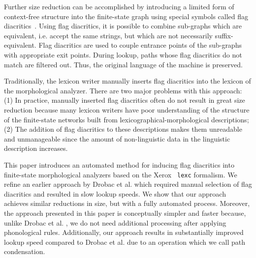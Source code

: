 \documentclass[11pt]{article}
\begin{document}

Further size reduction can be accomplished by introducing a limited
form of context-free structure into the finite-state graph using
special symbols called flag
diacritics~\cite{beesley1998constraining}. Using flag diacritics, it
is possible to combine sub-graphs which are equivalent, i.e. accept
the same strings, but which are not necessarily
suffix-equivalent. Flag diacritics are used to couple entrance points
of the sub-graphs with appropriate exit points. During lookup, paths
whose flag diacritics do not match are filtered out. Thus, the
original language of the machine is preserved.

Traditionally, the lexicon writer manually inserts flag diacritics
into the lexicon of the morphological analyzer. There are two major
problems with this approach: (1) In practice, manually inserted flag
diacritics often do not result in great size reduction because many
lexicon writers have poor understanding of the structure
of the finite-state networks built from lexicographical-morphological
descriptions; (2) The addition of flag diacritics to these
descriptions makes them unreadable and unmanageable since the amount
of non-linguistic data in the linguistic description increases.


This paper introduces an automated method for inducing flag diacritics
into finite-state morphological analyzers based on the Xerox {\tt
  lexc} formalism.  We refine an earlier approach by Drobac et
al.  which required manual selection of flag
diacritics and resulted in slow lookup speeds. We show that our
approach achieves similar reductions in size, but with a fully
automated process. Moreover, the approach presented in this paper is
conceptually simpler and faster because, unlike Drobac et
al. , we do not need additional processing after
applying phonological rules. Additionally, our approach results in
substantially improved lookup speed compared to Drobac et al. 
due to an operation which we call path condensation.
\end{document}
